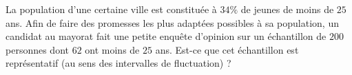 
\begin{exercice}\label{exosmath-0685}

    La population d'une certaine ville est constituée à \( 34\%\) de jeunes de moins de \( 25\) ans. Afin de faire des promesses les plus adaptées possibles à sa population, un candidat au mayorat fait une petite enquête d'opinion sur un échantillon de \( 200\) personnes dont \( 62\) ont moins de \( 25\) ans. Est-ce que cet échantillon est représentatif (au sens des intervalles de fluctuation) ?

\end{exercice}
